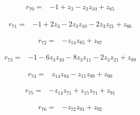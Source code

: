 \par\noindent\begin{minipage}{\linewidth}
\begin{align*}
r_{70}={}&-1+z_{3}-z_{3}z_{10}+z_{85}
\end{align*}
\end{minipage}\par
\par\noindent\begin{minipage}{\linewidth}
\begin{align*}
r_{71}={}&-1+2z_{3}-2z_{3}z_{10}-2z_{3}z_{21}+z_{86}
\end{align*}
\end{minipage}\par
\par\noindent\begin{minipage}{\linewidth}
\begin{align*}
r_{72}={}&-z_{14}z_{85}+z_{87}
\end{align*}
\end{minipage}\par
\par\noindent\begin{minipage}{\linewidth}
\begin{align*}
r_{73}={}&-1-6z_{3}z_{10}-8z_{3}z_{11}-2z_{3}z_{21}+z_{89}
\end{align*}
\end{minipage}\par
\par\noindent\begin{minipage}{\linewidth}
\begin{align*}
r_{74}={}&z_{14}z_{84}-z_{15}z_{89}+z_{90}
\end{align*}
\end{minipage}\par
\par\noindent\begin{minipage}{\linewidth}
\begin{align*}
r_{75}={}&-z_{14}z_{71}+z_{15}z_{71}+z_{91}
\end{align*}
\end{minipage}\par
\par\noindent\begin{minipage}{\linewidth}
\begin{align*}
r_{76}={}&-z_{72}z_{91}+z_{92}
\end{align*}
\end{minipage}\par

